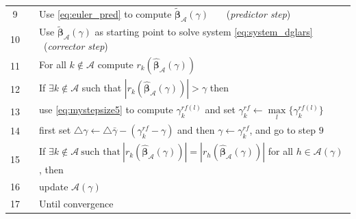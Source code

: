 \begin{table}[t!]
\begin{tabular}{ccp{12cm}}
		9 && \hspace{0.1in} Use \eqref{eq:euler_pred} to compute $\tilde{\boldsymbol{\beta}}_{\mathcal{A}}(\gamma)$ \ \ \  (\textit{predictor step}) \\
		
		10 && \hspace{0.1in} Use $\tilde{\boldsymbol{\beta}}_{\mathcal{A}}(\gamma)$ as starting point to solve system \eqref{eq:system_dglars} \ (\textit{corrector step}) \\
		
		
		11 && \hspace{0.1in} For all $k \notin \mathcal{A}$ compute $r_{k}(\hat{\boldsymbol{\beta}}_{\mathcal{A}}(\gamma))$  \\
		
		12 && \hspace{0.1in} If $\exists k \notin \mathcal{A}$ such that $\left|r_{k}(\hat{\boldsymbol{\beta}}_{\mathcal{A}}(\gamma) ) \right| > \gamma$ then \\
		
		13 && \hspace{0.3in} use \eqref{eq:mystepsize5} to compute $\gamma_{k}^{rf (l)}$ and set $\gamma_{k}^{rf} \leftarrow \underset{l}{\max} \{ \gamma_{k}^{rf (l)} \}$  \\
		
		14 && \hspace{0.3in} first set $\triangle \gamma \leftarrow \triangle \bar\gamma - (\gamma_{k}^{rf}-\gamma)$ and then $\gamma \leftarrow \gamma_{k}^{rf}$, and go to step $\textrm{9}$   \\
		
		15 && \hspace{0.1in} If $ \exists k \notin \mathcal{A}  \ \text{such that} \ \left|r_{k}(\hat{\boldsymbol{\beta}}_{\mathcal{A}}(\gamma))\right| = \left|r_{h}(\hat{\boldsymbol{\beta}}_{\mathcal{A}}(\gamma))\right|$ for all $ h \in \mathcal{A}(\gamma) $, then \\
		
		16 && \hspace{0.3in} update $\mathcal{A}(\gamma)$ \\
		
		17 && Until convergence \\
		\hline
	\end{tabular}
	\label{tab:ipc}
	\medskip
\end{table}


